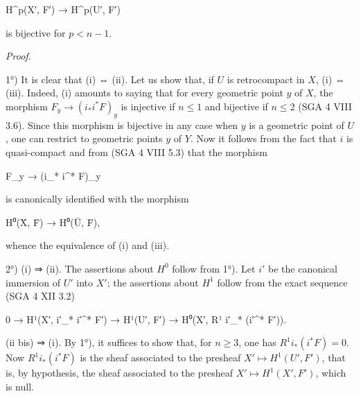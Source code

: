 \documentclass[
  11pt,
  a4paper,
]{book}
\newenvironment{Shaded}{}{}
\newcommand{\NormalTok}[1]{#1}
\begin{document}
\begin{Shaded}
\begin{Highlighting}[]
\NormalTok{H\^{}p(X′, F′) → H\^{}p(U′, F′)}
\end{Highlighting}
\end{Shaded}

is bijective for \(p < n - 1\).

\emph{Proof.}

1°) It is clear that (i) ⇔ (ii). Let us show that, if \(U\) is
retrocompact in \(X\), (i) ⇔ (iii). Indeed, (i) amounts to saying that
for every geometric point \(y\) of \(X\), the morphism
\(F_{y} \to (i_{*} i^{*} F)_{y}\) is injective if \(n
\leqslant 1\) and bijective if \(n \leqslant 2\) (SGA 4 VIII 3.6). Since
this morphism is bijective in any case when \(y\) is a geometric point
of \(U\), one can restrict to geometric points \(y\) of \(Y\). Now it
follows from the fact that \(i\) is quasi-compact and from (SGA 4 VIII
5.3) that the morphism

\begin{Shaded}
\begin{Highlighting}[]
\NormalTok{F\_y → (i\_* i\^{}* F)\_y}
\end{Highlighting}
\end{Shaded}

is canonically identified with the morphism

\begin{Shaded}
\begin{Highlighting}[]
\NormalTok{H⁰(X̄, F̄) → H⁰(Ū, F̄),}
\end{Highlighting}
\end{Shaded}

whence the equivalence of (i) and (iii).

2°) (i) ⇒ (ii). The assertions about \(H^{0}\) follow from 1°). Let
\(i'\) be the canonical immersion of \(U'\) into \(X'\); the assertions
about \(H^{1}\) follow from the exact sequence (SGA 4 XII 3.2)

\begin{Shaded}
\begin{Highlighting}[]
\NormalTok{0 → H¹(X′, i′\_* i′\^{}* F′) → H¹(U′, F′) → H⁰(X′, R¹ i′\_* (i′\^{}* F′)).}
\end{Highlighting}
\end{Shaded}

(ii bis) ⇒ (i). By 1°), it suffices to show that, for \(n \geqslant 3\),
one has \(R^{1} i_{*} (i^{*} F) = 0\). Now \(R^{1}
i_{*} (i^{*} F)\) is the sheaf associated to the presheaf
\(X' \mapsto H^{1}(U', F')\), that is, by hypothesis, the sheaf
associated to the presheaf \(X' \mapsto H^{1}(X', F')\), which is null.
\end{document}
